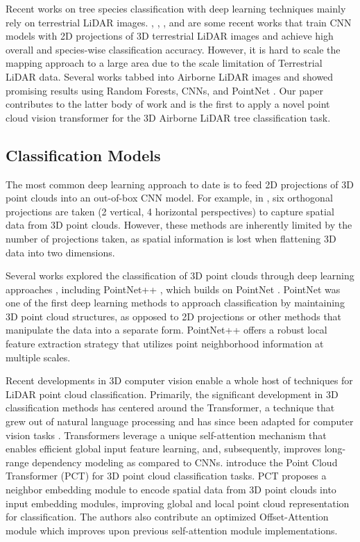 \documentclass[letterpaper]{article} %
\begin{document}
Recent works on tree species classification with deep learning techniques mainly rely on terrestrial LiDAR images. \citealt{zou2017tree}, \citealt{xi2020see}, \citealt{seidel2021predicting}, and \citealt{allen} are some recent works that train CNN models with 2D projections of 3D terrestrial LiDAR images and achieve high overall and species-wise classification accuracy. However, it is hard to scale the mapping approach to a large area due to the scale limitation of Terrestrial LiDAR data. Several works tabbed into Airborne LiDAR images and showed promising results using Random Forests, CNNs, and PointNet \cite{HAMRAZ2019219, BUDEI2018632, MAYRA2021112322, Hell2022}. Our paper contributes to the latter body of work and is the first to apply a novel point cloud vision transformer for the 3D Airborne LiDAR tree classification task. 

\subsection{Classification Models}

The most common deep learning approach to date is to feed 2D projections of 3D point clouds into an out-of-box CNN model. For example, in \citealt{allen}, six orthogonal projections are taken (2 vertical, 4 horizontal perspectives) to capture spatial data from 3D point clouds. However, these methods are inherently limited by the number of projections taken, as spatial information is lost when flattening 3D data into two dimensions. 

Several works explored the classification of 3D point clouds through deep learning approaches \cite{guo2019}, including PointNet++ \cite{pointnetplusplus}, which builds on PointNet \cite{pointnet}. PointNet was one of the first deep learning methods to approach classification by maintaining 3D point cloud structures, as opposed to 2D projections or other methods that manipulate the data into a separate form. PointNet++ offers a robust local feature extraction strategy that utilizes point neighborhood information at multiple scales.

Recent developments in 3D computer vision enable a whole host of techniques for LiDAR point cloud classification. Primarily, the significant development in 3D classification methods has centered around the Transformer, a technique that grew out of natural language processing and has since been adapted for computer vision tasks \cite{lu2022survey}. Transformers leverage a unique self-attention mechanism that enables efficient global input feature learning, and, subsequently, improves long-range dependency modeling as compared to CNNs. \citealt{guo2021} introduce the Point Cloud Transformer (PCT) for 3D point cloud classification tasks. PCT proposes a neighbor embedding module to encode spatial data from 3D point clouds into input embedding modules, improving global and local point cloud representation for classification. The authors also contribute an optimized Offset-Attention module which improves upon previous self-attention module implementations.
\end{document}
